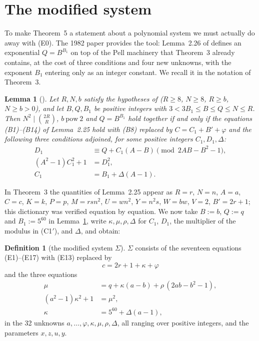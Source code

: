 \documentclass[11pt,letterpaper]{article}
\newtheorem{lemma}[theorem]{Lemma}
\theoremstyle{definition}
\newtheorem{definition}[theorem]{Definition}
\theoremstyle{remark}
\numberwithin{equation}{section}
\newcommand{\pow}{\ \mathrm{pow}\ }
\begin{document}
\section{The modified system}\label{sec:modified}

To make Theorem~5 a statement about a polynomial system we must actually do
away with (E0). The 1982 paper provides the tool: Lemma~2.26 of \cite{J82}
defines an exponential $Q=B^{B_1}$ on top of the Pell machinery that
Theorem~3 already contains, at the cost of three conditions and four new
unknowns, with the exponent $B_1$ entering only as an integer constant. We
recall it in the notation of Theorem~3.

\begin{lemma}[{\cite[Lemma 2.26, primed form]{J82}}]\label{lem:226}
Let $R,N,b$ satisfy the hypotheses of \textup{\cite[Lemma 2.25]{J82}}
($R\ge8$, $N\ge8$, $R\ge b$, $N\ge b>0$), and let $B,Q,B_1$ be positive
integers with $3<3B_1\le B\le Q\le N\le R$. Then
$N^2\mid\binom{2R}{R}$, $b\pow2$ and $Q=B^{B_1}$ hold together if and only if
the equations \textup{(B1)--(B14)} of Lemma~2.25 hold with \textup{(B8)}
replaced by $C=C_1+B'+\varphi$ and the following three conditions adjoined,
for some positive integers $C_1,D_1,\Delta$:
\begin{align*}
 D_1&\equiv Q+C_1(A-B)\pmod{2AB-B^2-1},\tag{C1$'$}\\
 (A^2-1)C_1^2+1&=D_1^2,\tag{C2$'$}\\
 C_1&=B_1+\Delta(A-1).\tag{C3$'$}
\end{align*}
\end{lemma}

In Theorem~3 the quantities of Lemma~2.25 appear as $R=r$, $N=n$, $A=a$,
$C=c$, $K=k$, $P=p$, $M=rsn^2$, $U=wn^2$, $Y=n^2s$, $W=bw$, $V=2$,
$B'=2r+1$; this dictionary was verified equation by equation. We now take $B:=b$, $Q:=q$ and $B_1:=5^{60}$ in Lemma~\ref{lem:226},
write $\kappa,\mu,\rho,\Delta$ for $C_1$, $D_1$, the multiplier of the
modulus in (C1$'$), and $\Delta$, and obtain:

\begin{definition}[the modified system $\Sigma$]\label{def:sigma}
$\Sigma$ consists of the seventeen equations \textup{(E1)--(E17)} with
\textup{(E13)} replaced by
\begin{equation}
 c=2r+1+\kappa+\varphi \tag{E13$'$}
\end{equation}
and the three equations
\begin{align}
 \mu&=q+\kappa(a-b)+\rho\,(2ab-b^2-1), \tag{E18}\\
 (a^2-1)\kappa^2+1&=\mu^2, \tag{E19}\\
 \kappa&=5^{60}+\Delta(a-1), \tag{E20}
\end{align}
in the 32 unknowns $a,\dots,\varphi,\kappa,\mu,\rho,\Delta$, all ranging over
positive integers, and the parameters $x,z,u,y$.
\end{definition}
\end{document}
